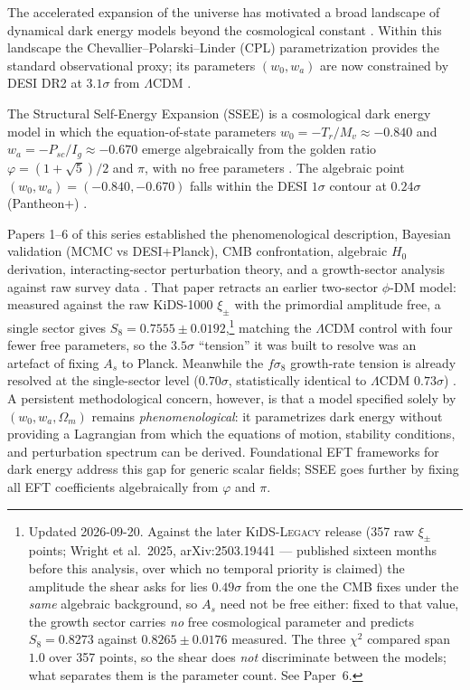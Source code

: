 \documentclass[12pt,a4paper]{article}
\begin{document}
The accelerated expansion of the universe
\citep{Perlmutter1999,Riess1998} has motivated a broad landscape of
dynamical dark energy models beyond the cosmological constant
\citep{Copeland2006,Weinberg2013review,Clifton2012,Joyce2015}.
Within this landscape the Chevallier--Polarski--Linder (CPL)
parametrization \citep{ChevallierPolarski2001,Linder2003} provides the
standard observational proxy; its parameters $(w_0,w_a)$ are now
constrained by DESI DR2 at $3.1\sigma$ from $\Lambda$CDM
\citep{desidr2_2025}.

The Structural Self-Energy Expansion (SSEE) is a cosmological dark
energy model in which the equation-of-state parameters
$w_0 = -T_r/M_v \approx -0.840$ and $w_a = -P_{sc}/I_g \approx -0.670$
emerge algebraically from the golden ratio $\varphi = (1+\sqrt{5})/2$ and
$\pi$, with no free parameters \citep{ssee_paper1,ssee_paper2}.
The algebraic point $(w_0,w_a) = (-0.840,-0.670)$ falls within
the DESI $1\sigma$ contour at $0.24\sigma$ (Pantheon+) \citep{ssee_paper2}.

Papers 1--6 of this series established the phenomenological description,
Bayesian validation (MCMC vs DESI+Planck), CMB confrontation, algebraic
$H_0$ derivation, interacting-sector perturbation theory, and a
growth-sector analysis against raw survey data \citep{ssee_paper6}. That paper
retracts an earlier two-sector $\phi$-DM model: measured against the raw
KiDS-1000 $\xi_\pm$ with the primordial amplitude free, a single sector gives
$S_8=0.7555\pm0.0192$,\footnote{Updated 2026-09-20. Against the later \textsc{KiDS-Legacy} release (357 raw $\xi_\pm$ points; Wright et al.\ 2025, arXiv:2503.19441 --- published sixteen months before this analysis, over which no temporal priority is claimed) the amplitude the shear asks for lies $0.49\sigma$ from the one the CMB fixes under the \emph{same} algebraic background, so $A_s$ need not be free either: fixed to that value, the growth sector carries \emph{no} free cosmological parameter and predicts $S_8=0.8273$ against $0.8265\pm0.0176$ measured. The three $\chi^2$ compared span $1.0$ over 357 points, so the shear does \emph{not} discriminate between the models; what separates them is the parameter count. See Paper~6.} matching the $\Lambda$CDM control with four fewer free
parameters, so the $3.5\sigma$ ``tension'' it was built to resolve was an
artefact of fixing $A_s$ to Planck. Meanwhile the
$f\sigma_8$ growth-rate tension is already resolved at the single-sector
level ($0.70\sigma$, statistically identical to $\Lambda$CDM $0.73\sigma$)
\citep{ssee_paper5}.
A persistent methodological concern, however, is that a model specified
solely by $(w_0, w_a, \Omega_m)$ remains \emph{phenomenological}: it
parametrizes dark energy without providing a Lagrangian from which the
equations of motion, stability conditions, and perturbation spectrum can
be derived.
Foundational EFT frameworks for dark energy \citep{Cheung2008} address
this gap for generic scalar fields; SSEE goes further by fixing all
EFT coefficients algebraically from $\varphi$ and $\pi$.
\end{document}
